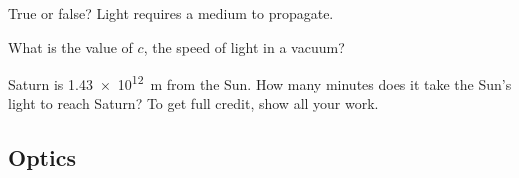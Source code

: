 \documentclass[../main-physics-problems.tex]{subfiles}
\begin{document}
\begin{questions}
\begin{center}
\vspace{-1.5cm}

\end{center}


\question
True or false? Light requires a medium to propagate.


\question
What is the value of $c$, the speed of light in a vacuum?


\question
Saturn is \SI{1.43e12}{m} from the Sun. How many minutes does it take the Sun’s light to reach Saturn? To get full credit, show all your work.
\end{questions}

\subsection{Optics}
\end{document}
